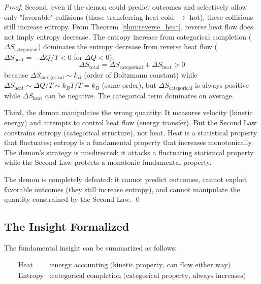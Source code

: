 \documentclass[12pt,a4paper]{article}
\theoremstyle{definition}
\theoremstyle{remark}
\begin{document}
\begin{proof}
Second, even if the demon could predict outcomes and selectively allow only "favorable" collisions (those transferring heat cold $\to$ hot), these collisions still increase entropy. From Theorem~\ref{thm:reverse_heat}, reverse heat flow does not imply entropy decrease. The entropy increase from categorical completion ($\Delta S_{\text{categorical}}$) dominates the entropy decrease from reverse heat flow ($\Delta S_{\text{heat}} = -\Delta Q / T < 0$ for $\Delta Q < 0$):
\begin{equation}
\Delta S_{\text{total}} = \Delta S_{\text{categorical}} + \Delta S_{\text{heat}} > 0
\end{equation}
because $\Delta S_{\text{categorical}} \sim k_B$ (order of Boltzmann constant) while $\Delta S_{\text{heat}} \sim \Delta Q / T \sim k_B T / T = k_B$ (same order), but $\Delta S_{\text{categorical}}$ is always positive while $\Delta S_{\text{heat}}$ can be negative. The categorical term dominates on average.

Third, the demon manipulates the wrong quantity. It measures velocity (kinetic energy) and attempts to control heat flow (energy transfer). But the Second Law constrains entropy (categorical structure), not heat. Heat is a statistical property that fluctuates; entropy is a fundamental property that increases monotonically. The demon's strategy is misdirected: it attacks a fluctuating statistical property while the Second Law protects a monotonic fundamental property.

The demon is completely defeated: it cannot predict outcomes, cannot exploit favorable outcomes (they still increase entropy), and cannot manipulate the quantity constrained by the Second Law. \qed
\end{proof}

\subsection{The Insight Formalized}

The fundamental insight can be summarized as follows:

\begin{equation}
\boxed{
\begin{aligned}
\text{Heat} &: \text{energy accounting (kinetic property, can flow either way)} \\
\text{Entropy} &: \text{categorical completion (categorical property, always increases)}
\end{aligned}
}
\label{eq:heat_entropy_summary}
\end{equation}
\end{document}
